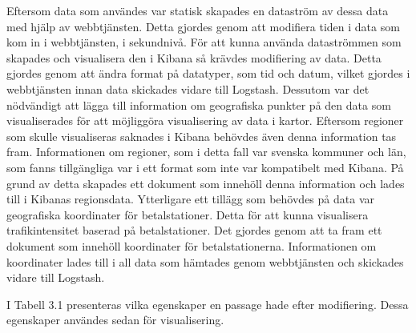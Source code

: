 \documentclass[12pt]{kththesis}
\begin{document}
Eftersom data som användes var statisk skapades en dataström av dessa data med hjälp av webbtjänsten. Detta gjordes genom att modifiera tiden i data som kom in i webbtjänsten, i sekundnivå. För att kunna använda dataströmmen som skapades och visualisera den i Kibana så krävdes modifiering av data. Detta gjordes genom att ändra format på datatyper, som tid och datum, vilket gjordes i webbtjänsten innan data skickades vidare till Logstash. Dessutom var det nödvändigt att lägga till information om geografiska punkter på den data som visualiserades för att möjliggöra visualisering av data i kartor. Eftersom regioner som skulle visualiseras saknades i Kibana behövdes även denna information tas fram. Informationen om regioner, som i detta fall var svenska kommuner och län, som fanns tillgängliga var i ett format som inte var kompatibelt med Kibana. På grund av detta skapades ett dokument som innehöll denna information och lades till i Kibanas regionsdata. Ytterligare ett tillägg som behövdes på data var geografiska koordinater för betalstationer. Detta för att kunna visualisera trafikintensitet baserad på betalstationer. Det gjordes genom att ta fram ett dokument som innehöll koordinater för betalstationerna. Informationen om koordinater lades till i all data som hämtades genom webbtjänsten och skickades vidare till Logstash. 

I Tabell 3.1 presenteras vilka egenskaper en passage hade efter modifiering. Dessa egenskaper användes sedan för visualisering. 
\newpage
\captionsetup[table]{name=Tabell}
\end{document}
